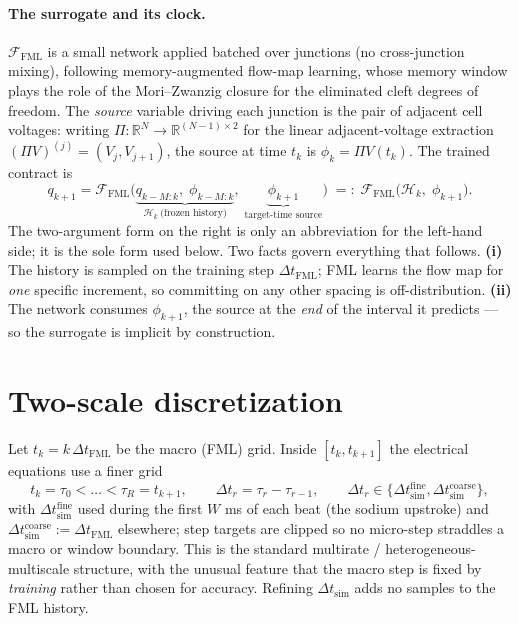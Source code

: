 \documentclass[11pt]{article}
\newcommand{\FML}{\mathcal{F}_{\mathrm{FML}}}
\newcommand{\Rn}{\mathbb{R}}
\newcommand{\dtF}{\Delta t_{\mathrm{FML}}}
\newcommand{\dtS}{\Delta t_{\mathrm{sim}}}
\begin{document}
\paragraph{The surrogate and its clock.}
$\FML$ is a small network applied batched over junctions (no cross-junction
mixing), following memory-augmented flow-map learning, whose memory window plays the role of the
Mori--Zwanzig closure for the eliminated cleft degrees of freedom. The
\emph{source} variable driving each junction is the pair of adjacent cell
voltages: writing $\Pi:\Rn^N\to\Rn^{(N-1)\times2}$ for the linear
adjacent-voltage extraction $(\Pi V)^{(j)}=(V_j,V_{j+1})$, the source at time
$t_k$ is $\phi_k=\Pi V(t_k)$. The trained contract is
\begin{equation}
q_{k+1}=\FML\bigl(\underbrace{q_{k-M{:}k},\;\phi_{k-M{:}k}}_{\textstyle
\mathcal H_k\ \text{(frozen history)}},\;
\underbrace{\phi_{k+1}}_{\text{target-time source}}\bigr)
\;=:\;\FML\bigl(\mathcal H_k,\;\phi_{k+1}\bigr).
\label{eq:fml}
\end{equation}
The two-argument form on the right is only an abbreviation for the left-hand
side; it is the sole form used below. Two facts govern everything that follows.
\textbf{(i)} The history is sampled on the training step $\dtF$; FML learns the
flow map for \emph{one} specific increment, so committing on any other spacing
is off-distribution. \textbf{(ii)} The network consumes $\phi_{k+1}$, the source
at the \emph{end} of the interval it predicts --- so the surrogate is implicit
by construction.

\section{Two-scale discretization}

Let $t_k=k\,\dtF$ be the macro (FML) grid. Inside $[t_k,t_{k+1}]$ the electrical
equations use a finer grid
\begin{equation}
t_k=\tau_0<\dots<\tau_R=t_{k+1},
\qquad
\Delta t_r=\tau_r-\tau_{r-1},
\qquad
\Delta t_r\in\{\dtS^{\mathrm{fine}},\dtS^{\mathrm{coarse}}\},
\end{equation}
with $\dtS^{\mathrm{fine}}$ used during the first $W$ ms of each beat (the
sodium upstroke) and $\dtS^{\mathrm{coarse}}:=\dtF$ elsewhere; step targets are
clipped so no micro-step straddles a macro or window boundary. This is the
standard multirate / heterogeneous-multiscale structure, with the unusual feature that the macro step is fixed by
\emph{training} rather than chosen for accuracy. Refining $\dtS$ adds no samples
to the FML history.
\end{document}
